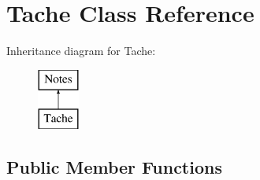 \hypertarget{class_tache}{}\section{Tache Class Reference}
\label{class_tache}
Inheritance diagram for Tache\+:\begin{figure}[H]
\begin{center}
\leavevmode
\includegraphics[height=2.000000cm]{class_tache}
\end{center}
\end{figure}
\subsection*{Public Member Functions}
